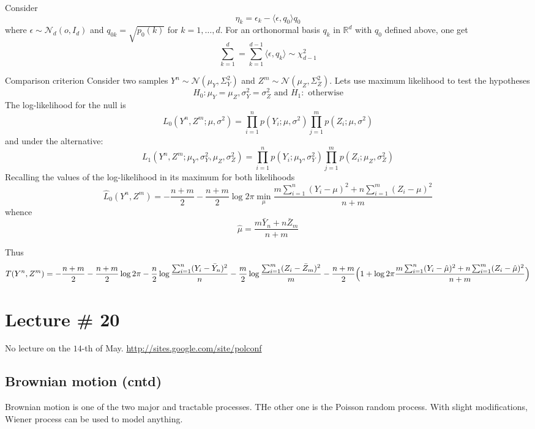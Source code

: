 \documentclass[a4paper]{article}
\newcommand{\Real}{\mathbb{R}}
\newcommand{\Ncal}{\mathcal{N}}
\begin{document}
Consider
\[\eta_k = \epsilon_k - \langle \epsilon, q_0\rangle q_0\]
where $\epsilon \sim \Ncal_d(o, I_d)$ and $q_{0k} = \sqrt{p_0(k)}$ for $k=1,\ldots,d$.
For an orthonormal basis $q_k$ in $\Real^d$ with $q_0$ defined above, one get
\[
\sum_{k=1}^d
= \sum_{k=1}^{d-1} \langle \epsilon, q_k \rangle
\sim \chi^2_{d-1}
\]

Comparison criterion
Consider two samples $Y^n\sim \Ncal(\mu_Y,\Sigma^2_Y)$ and $Z^m\sim \Ncal(\mu_Z,\Sigma^2_Z)$.
Lets use maximum likelihood to test the hypotheses
\[H_0: \mu_Y = \mu_Z, \sigma^2_Y = \sigma^2_Z\text{ and } H_1:\text{ otherwise}\]
The log-likelihood for the null is
\[
L_0(Y^n,Z^m;\mu,\sigma^2)
= \prod_{i=1}^n p(Y_i;\mu,\sigma^2)\prod_{j=1}^m p(Z_i;\mu,\sigma^2)
\]
and under the alternative:
\[
L_1(Y^n,Z^m;\mu_Y,\sigma^2_Y,\mu_Z,\sigma^2_Z)
= \prod_{i=1}^n p(Y_i;\mu_Y,\sigma^2_Y) \prod_{j=1}^m p(Z_i;\mu_Z,\sigma^2_Z)
\]
Recalling the values of the log-likelihood in its maximum for both likelihoods
\[
\hat{L}_0(Y^n,Z^m)
= -\frac{n+m}{2} - \frac{n+m}{2} \log 2\pi
	\min_\mu \frac{m\sum_{i=1}^n (Y_i - \mu)^2 + n\sum_{i=1}^m (Z_i - \mu)^2}{n+m}
\]
whence
\[ \hat{\mu} = \frac{m\bar{Y}_n + n\bar{Z}_m}{n+m} \]

Thus
\[
T(Y^n,Z^m)
= -\frac{n+m}{2} - \frac{n+m}{2} \log 2\pi
  - \frac{n}{2} \log \frac{\sum_{i=1}^n (Y_i - \bar{Y}_n)^2}{n}
  - \frac{m}{2} \log \frac{\sum_{i=1}^m (Z_i - \bar{Z}_m)^2}{m}
- \frac{n+m}{2}\Bigl( 1
	+ \log 2\pi \frac{m\sum_{i=1}^n (Y_i - \hat{\mu})^2 + n\sum_{i=1}^m (Z_i - \hat{\mu})^2}{n+m}
\Bigr)
\]



\section{Lecture \# 20} %
\label{sec:lecture_20}

No lecture on the $14$-th of May. \url{http://sites.google.com/site/polconf}

\subsection{Brownian motion (cntd)} %
\label{sub:brownian_motion_cntd}

Brownian motion is one of the two major and tractable processes. THe other one is
the Poisson random process. With slight modifications, Wiener process can be used to model anything.
\end{document}
